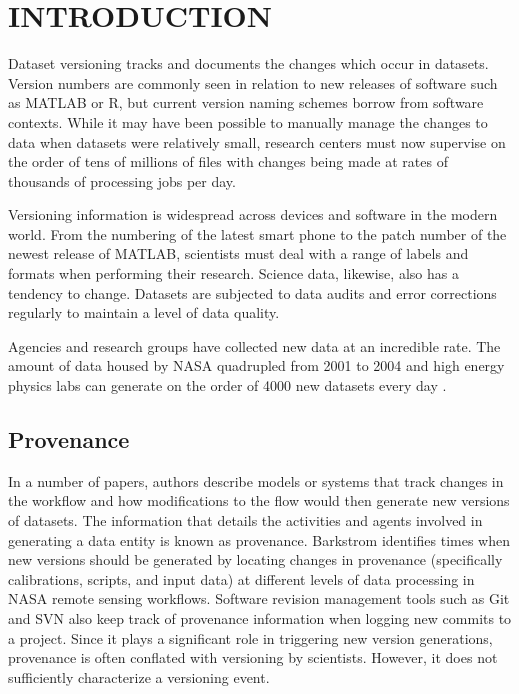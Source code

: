 
\chapter{INTRODUCTION}

Dataset versioning tracks and documents the changes which occur in datasets.  Version numbers are commonly seen in relation to new releases of software such as MATLAB or R, but current version naming schemes borrow from software contexts.  While it may have been possible to manually manage the changes to data when datasets were relatively small, research centers must now supervise on the order of tens of millions of files with changes being made at rates of thousands of processing jobs per day.

Versioning information is widespread across devices and software in the modern world.  From the numbering of the latest smart phone to the patch number of the newest release of MATLAB, scientists must deal with a range of labels and formats when performing their research.  Science data, likewise, also has a tendency to change.  Datasets are subjected to data audits and error corrections regularly to maintain a level of data quality.

Agencies and research groups have collected new data at an incredible rate.  The amount of data housed by NASA quadrupled from 2001 to 2004 \cite{barkstromLibrary} and high energy physics labs can generate on the order of 4000 new datasets every day \cite{ATLAS}.

\section{Provenance}
In a number of papers, authors describe models or systems that track changes in the workflow and how modifications to the flow would then generate new versions of datasets.  The information that details the activities and agents involved in generating a data entity is known as provenance.  Barkstrom identifies times when new versions should be generated by locating changes in provenance (specifically calibrations, scripts, and input data) at different levels of data processing in NASA remote sensing workflows.  Software revision management tools such as Git and SVN also keep track of provenance information when logging new commits to a project.  Since it plays a significant role in triggering new version generations, provenance is often conflated with versioning by scientists.  However, it does not sufficiently characterize a versioning event.

